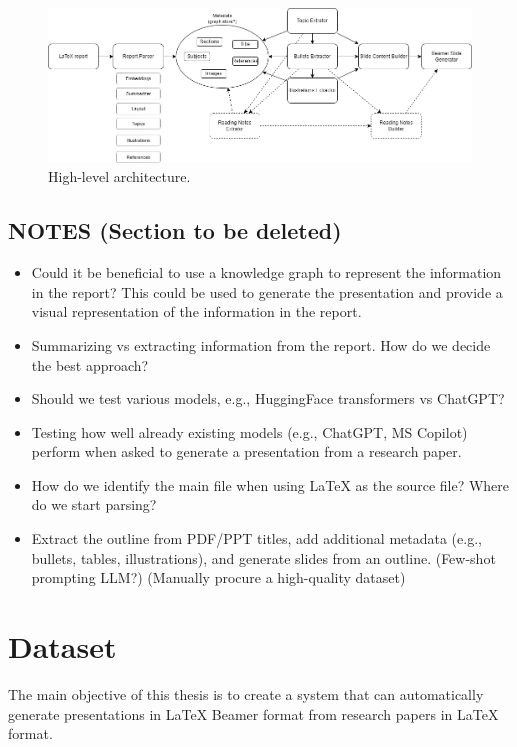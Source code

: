 \begin{figure}
    \centering
    \includegraphics[width=1\linewidth]{images/High-Level Architecture Diagram.png}
    \caption{High-level architecture.}
    \label{fig:high-level-architecture}
\end{figure}

%
\subsection{NOTES (Section to be deleted)}
\begin{itemize}
    \item Could it be beneficial to use a knowledge graph to represent the information in the report? This could be used to generate the presentation and provide a visual representation of the information in the report.
    \item Summarizing vs extracting information from the report. How do we decide the best approach?
    \item Should we test various models, e.g., HuggingFace transformers vs ChatGPT?
    \item Testing how well already existing models (e.g., ChatGPT, MS Copilot) perform when asked to generate a presentation from a research paper.
    \item How do we identify the main file when using LaTeX as the source file? Where do we start parsing? 
    \item Extract the outline from PDF/PPT titles, add additional metadata (e.g., bullets, tables, illustrations), and generate slides from an outline. (Few-shot prompting LLM?) (Manually procure a high-quality dataset)
\end{itemize}

\section{Dataset}

The main objective of this thesis is to create a system that can automatically generate presentations in \LaTeX{} Beamer format from research papers in \LaTeX{} format.

